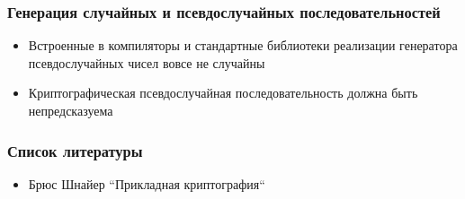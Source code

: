 \documentclass{beamer}
\begin{document}
\begin{frame}
  \frametitle{Генерация случайных и псевдослучайных последовательностей}

  \begin{itemize}
    \item{Встроенные в компиляторы и стандартные библиотеки реализации генератора псевдослучайных чисел вовсе не случайны}
    \item{Криптографическая псевдослучайная последовательность должна быть непредсказуема}
  \end{itemize}
\end{frame}


\begin{frame}
  \frametitle{Список литературы}

  \begin{itemize}
    \item{Брюс Шнайер ``Прикладная криптография``}
  \end{itemize}
\end{frame}
\end{document}
